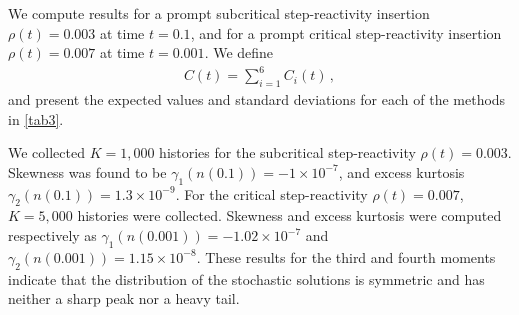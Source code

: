 \documentclass[preprint,12pt,authoryear]{elsarticle}
\begin{document}
We compute results for a prompt subcritical step-reactivity insertion $\rho(t)=0.003$ at time $t=0.1$, and for a prompt critical step-reactivity insertion $\rho(t)=0.007$ at time $t=0.001$.
We define
\begin{align}
C(t)=\sum_{i=1}^6 C_i(t)\,,
\end{align}
and present the expected values and standard deviations for each of the methods in \cref{tab3}.
\begin{table}[H]
\caption{Results for six groups of precursors with subcritical $(\rho(t)=0.003)$ and critical $(\rho(t)=0.007)$ step-reactivity insertions.}\label{tab3}
\end{table}
We collected $K=1,000$ histories for the subcritical step-reactivity $\rho(t)=0.003$.
Skewness was found to be $\gamma_1(n(0.1)) = -1\times 10^{-7}$, and excess kurtosis $\gamma_2(n(0.1)) = 1.3\times 10^{-9}$.
For the critical step-reactivity $\rho(t)=0.007$, $K=5,000$ histories were collected.
Skewness and excess kurtosis were computed respectively as $\gamma_1(n(0.001))=-1.02\times 10^{-7}$ and $\gamma_2(n(0.001))=1.15\times 10^{-8}$.
These results for the third and fourth moments indicate that the distribution of the stochastic solutions is symmetric and has neither a sharp peak nor a heavy tail.
\end{document}
